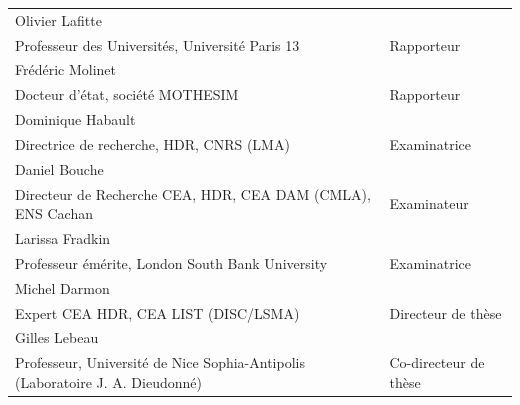 \documentclass[a4paper]{article}
\newcommand{\jurynameA}{Dominique Habault}
\newcommand{\juryadressA}{Directrice de recherche, HDR, CNRS (LMA)}
\newcommand{\juryroleA}{Examinatrice}
\newcommand{\jurynameB}{Olivier Lafitte}
\newcommand{\juryadressB}{Professeur des Universités, Université Paris 13}
\newcommand{\juryroleB}{Rapporteur}
\newcommand{\jurynameC}{Frédéric Molinet}
\newcommand{\juryadressC}{Docteur d'état, société MOTHESIM}
\newcommand{\juryroleC}{Rapporteur}
\newcommand{\jurynameD}{Daniel Bouche}
\newcommand{\juryadressD}{Directeur de Recherche CEA, HDR, CEA DAM (CMLA), ENS Cachan}
\newcommand{\juryroleD}{Examinateur}
\newcommand{\jurynameE}{Larissa Fradkin}
\newcommand{\juryadressE}{Professeur émérite, London South Bank University}
\newcommand{\juryroleE}{Examinatrice}
\newcommand{\jurynameF}{Michel Darmon}
\newcommand{\juryadressF}{Expert CEA HDR, CEA LIST (DISC/LSMA)}
\newcommand{\juryroleF}{Directeur de thèse}
\newcommand{\jurynameG}{Gilles Lebeau}
\newcommand{\juryadressG}{Professeur, Université de Nice Sophia-Antipolis (Laboratoire J. A. Dieudonné)}
\newcommand{\juryroleG}{Co-directeur de thèse}
\begin{document}
\begin{textblock}{10.3}
	\label{jury} 																				%
	\begin{flushleft}
	\begin{tabular}{@{} L{9.5cm} R{4.5cm}}
		\jurynameB  \\ \juryadressB & \juryroleB \\[10pt]
		\jurynameC  \\ \juryadressC & \juryroleC \\[10pt]
		\jurynameA  \\ \juryadressA & \juryroleA \\[10pt]
		\jurynameD  \\ \juryadressD & \juryroleD \\[10pt]
		\jurynameE  \\ \juryadressE & \juryroleE \\[10pt]
		\jurynameF  \\ \juryadressF & \juryroleF \\[10pt]
		\jurynameG  \\ \juryadressG & \juryroleG \\[10pt]
	\end{tabular} 
	\end{flushleft}   
\end{textblock}
\end{document}
